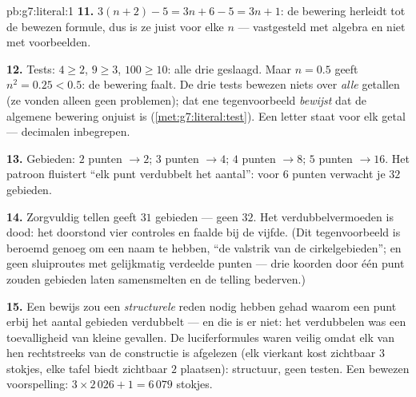 \begin{solution}{pb:g7:literal:1}
\textbf{11.} $3(n + 2) - 5 = 3n + 6 - 5 = 3n + 1$: de bewering herleidt tot de
bewezen formule, dus is ze juist voor elke $n$ --- vastgesteld met algebra en niet
met voorbeelden.

\textbf{12.} Tests: $4 \geq 2$, $9 \geq 3$, $100 \geq 10$: alle drie geslaagd.
Maar $n = 0.5$ geeft $n^2 = 0.25 < 0.5$: de bewering faalt. De drie tests bewezen
niets over \emph{alle} getallen (ze vonden alleen geen problemen); dat ene
tegenvoorbeeld \emph{bewijst} dat de algemene bewering onjuist is
(\cref{met:g7:literal:test}). Een letter staat voor elk getal --- decimalen
inbegrepen.

\textbf{13.} Gebieden: $2$ punten $\to 2$; $3$ punten $\to 4$; $4$ punten
$\to 8$; $5$ punten $\to 16$. Het patroon fluistert ``elk punt verdubbelt het
aantal'': voor $6$ punten verwacht je $32$ gebieden.

\textbf{14.} Zorgvuldig tellen geeft $31$ gebieden --- geen $32$. Het
verdubbelvermoeden is dood: het doorstond vier controles en faalde bij de vijfde.
(Dit tegenvoorbeeld is beroemd genoeg om een naam te hebben, ``de valstrik van de
cirkelgebieden''; en geen sluiproutes met gelijkmatig verdeelde punten --- drie
koorden door één punt zouden gebieden laten samensmelten en de telling bederven.)

\textbf{15.} Een bewijs zou een \emph{structurele} reden nodig hebben gehad waarom
een punt erbij het aantal gebieden verdubbelt --- en die is er niet: het
verdubbelen was een toevalligheid van kleine gevallen. De luciferformules waren
veilig omdat elk van hen rechtstreeks van de constructie is afgelezen (elk vierkant
kost zichtbaar $3$ stokjes, elke tafel biedt zichtbaar $2$ plaatsen): structuur,
geen testen. Een bewezen voorspelling: $3 \times 2\,026 + 1 = 6\,079$ stokjes.
\end{solution}
